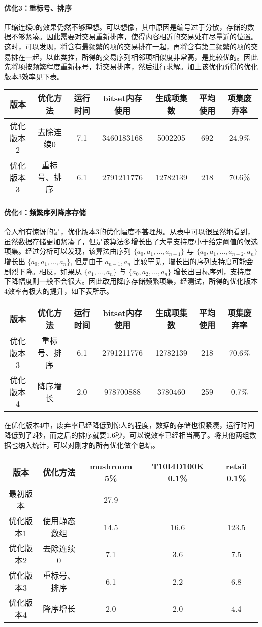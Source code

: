 \documentclass[a4paper,9pt]{article}
\begin{document}
\paragraph{优化3：重标号、排序}
压缩连续0的效果仍然不够理想。可以想像，其中原因是编号过于分散，存储的数据不够紧凑。因此需要对交易重新排序，使得内容相近的交易处在尽量近的位置。这时，可以发现，将含有最频繁的项的交易排在一起，再将含有第二频繁的项的交易排在一起，以此类推，所得的交易序列相邻项相似度非常高，是比较优的。因此先将项按频繁程度重新标号，将交易排序，然后进行求解。加上该优化所得的优化版本3效率见下表。
\begin{center}
	\begin{tabular}{ccccccc}
		版本&优化方法&运行时间&bitset内存使用&生成项集数&平均使用&项集废弃率\\\hline
		优化版本2&去除连续0&7.1&3460183168&5002205&692&24.9\%\\
		优化版本3&重标号、排序&6.1&2791211776&12782139&218&70.6\%
	\end{tabular}
\end{center}

\paragraph{优化4：频繁序列降序存储}
令人稍有惊讶的是，优化版本3的优化幅度不甚理想。从表中可以很显然地看到，虽然数据存储更加紧凑了，但是该算法多增长出了大量支持度小于给定阈值的候选项集。经过分析可以发现，该算法由序列 $\{a_0,a_1,...,a_{n-1}\}$ 与 $\{a_0,a_1,...,a_{n-2},a_n\}$ 增长出 $\{a_0,a_1,...,a_n\}$, 但是由于 $a_{n-1},a_n$ 比较罕见，增长出的序列支持度可能会剧烈下降。相反，如果从 $\{a_1,...,a_n\}$ 与 $\{a_0,a_2,...,a_n\}$ 增长出目标序列，支持度下降幅度则一般不会很大。因此改用降序存储频繁项集，经测试，所得的优化版本4效率有极大的提升，如下表所示。
\begin{center}
	\begin{tabular}{ccccccc}
		版本&优化方法&运行时间&bitset内存使用&生成项集数&平均使用&项集废弃率\\\hline
		优化版本3&重标号、排序&6.1&2791211776&12782139&218&70.6\%\\
		优化版本4&降序增长&2.0&978700888&3780460&259&0.7\%
	\end{tabular}
\end{center}
在优化版本4中，废弃率已经降低到惊人的程度，数据的存储也很紧凑，运行时间降低到了2秒，而之后的排序就要1.6秒，可以说效率已经相当高了。将其他两组数据也纳入统计，可以对刚才的所有优化做个总结。
\begin{center}
	\begin{tabular}{ccccc}
		版本&优化方法&mushroom 5\%&T10I4D100K 0.1\%&retail 0.1\%\\\hline
		最初版本&-&27.9&-&-\\
		优化版本1&使用静态数组&14.5&16.6&123.5\\
		优化版本2&去除连续0&7.1&3.6&7.5\\
		优化版本3&重标号、排序&6.1&2.2&6.8\\
		优化版本4&降序增长&2.0&2.0&4.4
	\end{tabular}
\end{center}
\end{document}
